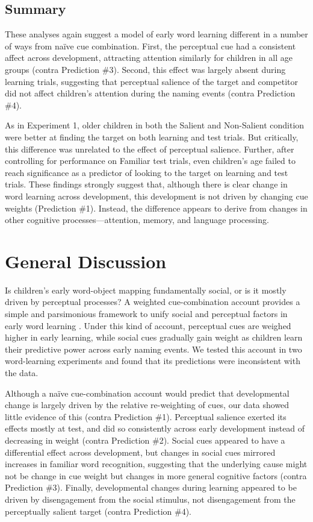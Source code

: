 \documentclass[man,floatsintext]{apa6}
\begin{document}
\subsection{Summary}

These analyses again suggest a model of early word learning different in a number of ways from na\"{i}ve cue combination. First, the perceptual cue had a consistent affect across development, attracting attention similarly for children in all age groups (contra Prediction \#3). Second, this effect was largely absent during learning trials, suggesting that perceptual salience of the target and competitor did not affect children's attention during the naming events (contra Prediction \#4). 

As in Experiment 1, older children in both the Salient and Non-Salient condition were better at finding the target on both learning and test trials. But critically, this difference was unrelated to the effect of perceptual salience. Further, after controlling for performance on Familiar test trials, even children's age failed to reach significance as a predictor of looking to the target on learning and test trials. These findings strongly suggest that, although there is clear change in word learning across development, this development is not driven by changing cue weights (Prediction \#1). Instead, the difference appears to derive from changes in other cognitive processes---attention, memory, and language processing.

\section{General Discussion}

Is children's early word-object mapping fundamentally social, or is it mostly driven by perceptual processes? A weighted cue-combination account provides a simple and parsimonious framework to unify social and perceptual factors in early word learning \cite{Hollich2000,Yu2007b,Frank2013a}. Under this kind of account, perceptual cues are weighed higher in early learning, while social cues gradually gain weight as children learn their predictive power across early naming events. We tested this account in two word-learning experiments and found that its predictions were inconsistent with the data. 

Although a na\"{i}ve cue-combination account would predict that developmental change is largely driven by the relative re-weighting of cues, our data showed little evidence of this (contra Prediction \#1). Perceptual salience exerted its effects mostly at test, and did so consistently across early development instead of decreasing in weight (contra Prediction \#2). Social cues appeared to have a differential effect across development, but changes in social cues mirrored increases in familiar word recognition, suggesting that the underlying cause might not be change in cue weight but changes in more general cognitive factors (contra Prediction \#3). Finally, developmental changes during learning appeared to be driven by disengagement from the social stimulus, not disengagement from the perceptually salient target (contra Prediction \#4). 
\end{document}

